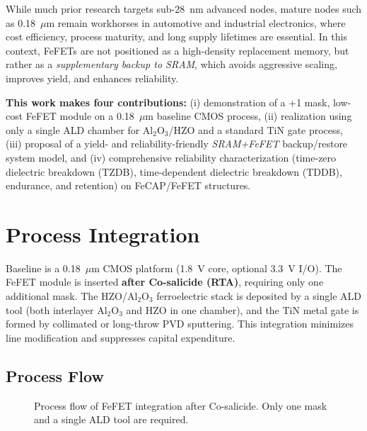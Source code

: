 \documentclass[conference]{IEEEtran}
\begin{document}
While much prior research targets sub-28~nm advanced nodes, mature nodes such as 0.18~$\mu$m remain workhorses in automotive and industrial electronics, 
where cost efficiency, process maturity, and long supply lifetimes are essential.  
In this context, FeFETs are not positioned as a high-density replacement memory, but rather as a \textit{supplementary backup to SRAM}, 
which avoids aggressive scaling, improves yield, and enhances reliability.

\textbf{This work makes four contributions:}  
(i) demonstration of a +1 mask, low-cost FeFET module on a 0.18~$\mu$m baseline CMOS process,  
(ii) realization using only a single ALD chamber for Al$_2$O$_3$/HZO and a standard TiN gate process,  
(iii) proposal of a yield- and reliability-friendly \textit{SRAM+FeFET} backup/restore system model, and  
(iv) comprehensive reliability characterization (time-zero dielectric breakdown (TZDB), time-dependent dielectric breakdown (TDDB), endurance, and retention) on FeCAP/FeFET structures.

\FloatBarrier

\section{Process Integration}
Baseline is a 0.18~$\mu$m CMOS platform (1.8~V core, optional 3.3~V I/O).
The FeFET module is inserted \textbf{after Co-salicide (RTA)}, requiring only one additional mask.
The HZO/Al$_2$O$_3$ ferroelectric stack is deposited by a single ALD tool (both interlayer Al$_2$O$_3$ and HZO in one chamber), 
and the TiN metal gate is formed by collimated or long-throw PVD sputtering.
This integration minimizes line modification and suppresses capital expenditure.

\subsection{Process Flow}
\begin{figure}[!htb]
  \centering
  \caption{Process flow of FeFET integration after Co-salicide. Only one mask and a single ALD tool are required.}
  \label{fig:flow}
\end{figure}
\end{document}
